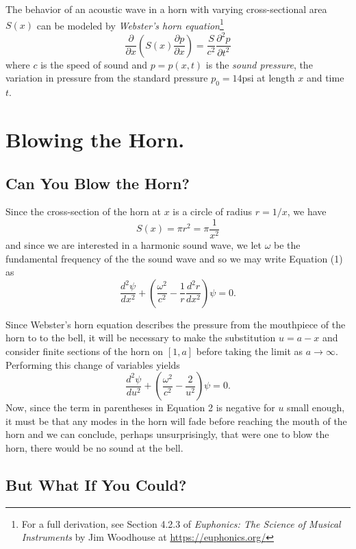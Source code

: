 The behavior of an acoustic wave in a horn with varying cross-sectional area $S(x)$
can be modeled by \emph{Webster's horn equation}\footnote{For a full derivation, see Section 4.2.3 of \emph{Euphonics: The Science of Musical Instruments}
by Jim Woodhouse at \url{https://euphonics.org/}}
\begin{equation}
    \frac{\partial}{\partial x} \left( S(x)\frac{\partial p}{\partial x} \right)
    = \frac{S}{c^2} \frac{\partial^2 p}{\partial t^2}
\end{equation}
where $c$ is the speed of sound and $p = p(x,t)$ is the \emph{sound pressure}, the
variation in pressure from the standard pressure $p_0 = 14$psi at length $x$ and time $t$.

\section{Blowing the Horn.}

\subsection{Can You Blow the Horn?}

Since the cross-section of the horn at $x$ is a circle of radius $r = 1/x$,
we have
\[
    S(x) = \pi r^2 = \pi \frac{1}{x^2}
\]
and since we are interested in a harmonic sound wave, we let $\omega$ be the
fundamental frequency of the the sound wave and so we may write Equation (1) as
\[
    \frac{d^2 \psi}{dx^2}
    + \left(\frac{\omega^2}{c^2} - \frac{1}{r}\frac{d^2 r}{dx^2}\right)\psi = 0.
\]

Since Webster's horn equation describes the pressure from the mouthpiece of the horn to
to the bell, it will be necessary to make the substitution $u = a - x$ and consider
finite sections of the horn on $[1,a]$ before taking the limit as $a \to \infty$.
Performing this change of variables yields
\begin{equation}
    \frac{d^2 \psi}{du^2} + \left(\frac{\omega^2}{c^2} - \frac{2}{u^2}\right)\psi = 0.
\end{equation}
Now, since the term in parentheses in Equation 2 is negative for $u$ small enough,
it must be that any modes in the horn will fade before reaching the mouth of the horn
and we can conclude, perhaps unsurprisingly, that were one to blow the horn, there would be
no sound at the bell.

\subsection{But What If You Could?}

